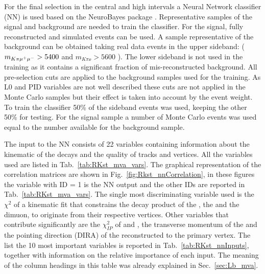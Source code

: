 For the final selection in the central and high \qsq intervals a Neural Network classifier (NN)
is used based on the NeuroBayes package \cite{Feindt:2006pm,feindt-2004}.
Representative samples of the signal and background are needed to train the classifier.
For the signal, fully reconstructed \BdToKstmm and \BdKstee simulated events can be used.
A sample representative of the background can be obtained taking real data events
in the upper \Bz sideband: ($m_{K\pi\mumu} > 5400$ \mevcc and $m_{K\pi\ee} > 5600$ \mevcc). The lower sideband is not
used in the training as it contains a significant fraction of mis-reconstructed background.
All pre-selection cuts are applied to the background samples used for the training.
As L0 and PID variables are not well described these cuts are not applied in the Monte Carlo
samples but their effect is taken into account by the event weight.
To train the classifier 50\% of the sideband events was used, keeping the other 50\% for testing.
For the signal sample a number of Monte Carlo events was used equal to the number available for
the background sample. 

The input to the NN consists of 22 variables containing information about the kinematic of the decays
and the quality of tracks and vertices. All the variables used are listed in Tab.~\ref{tab:RKst_mva_vars}.
The graphical representation of the correlation matrices are shown in Fig.~\ref{fig:Rkst_nnCorrelation},
in these figures the variable with ID = 1 is the NN output and the other IDs are reported in Tab.~\ref{tab:RKst_mva_vars}.
%
The single most discriminating variable used is the $\chi^2$ of a kinematic fit
that constrains the decay product of the \Bz, the \Kstar and the dimuon, to originate from their respective vertices.
Other variables that contribute significantly are the $\chi^2_{IP}$ of \jpsi and \Kstar, the transverse momentum
of the \Bz and the pointing direction (DIRA) of the reconstructed \Bz to the primary vertex.
The list the 10 most important variables is reported in Tab.~\ref{tab:RKst_nnInputs}, together
with information on the relative importance of each input. The meaning of the column headings
in this table was already explained in Sec.~\ref{sec:Lb_mva}.

